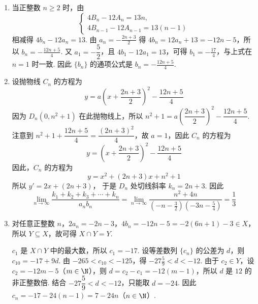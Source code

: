 \begin{solution}
\begin{enumerate}
\item 当正整数 \(n\geqslant2\) 时，由
\[
\begin{cases}
4B_n-12A_n=13n,\\
4B_{n-1}-12A_{n-1}=13(n-1)
\end{cases}
\]
相减得 \(4b_n-12a_n=13\). 由 \(a_n=-\frac{2n+3}{2}\) 得
\(4b_n=12a_n+13=-12n-5\)，所以 \(b_n=-\frac{12n+5}{4}\).
又 \(a_1=-\dfrac52\)，且 \(4b_1-12a_1=13\)，可得 \(b_1=-\frac{17}{4}\)，与上式在 \(n=1\) 时一致. 因此 \(\{b_n\}\) 的通项公式是 \(b_n=-\frac{12n+5}{4}\).

\item 设抛物线 \(C_n\) 的方程为
\[
y=a\left(x+\frac{2n+3}{2}\right)^2-\frac{12n+5}{4}
\]
因为 \(D_n(0,n^{2}+1)\) 在此抛物线上，所以
\(n^2+1=a\left(\dfrac{2n+3}{2}\right)^2-\dfrac{12n+5}{4}\). 注意到 \(n^2+1+\dfrac{12n+5}{4}=\dfrac{(2n+3)^2}{4}\)，故 \(a=1\)，因此 \(C_n\) 的方程为
\[
y=\left(x+\frac{2n+3}{2}\right)^2-\frac{12n+5}{4}
\]
因此，\(C_n\) 的方程为
\[
y=x^2+(2n+3)x+n^2+1
\]
所以 \(y'=2x+(2n+3)\)，
于是 \(D_n\) 处切线斜率 \(k_n=2n+3\).
因此
\[
\lim_{n\to\infty}\frac{k_1+k_2+k_3+\cdots+k_n}{a_nb_n}
=\lim_{n\to\infty}\frac{n^2+4n}{\left(-n-\frac{3}{2}\right)\left(-3n-\frac{5}{4}\right)}
=\frac{1}{3}
\]

\item 对任意正整数 \(n\)，\(2a_n=-2n-3\)，\(4b_n=-12n-5=-2(6n+1)-3\in X\)，所以 \(Y\subseteq X\)，故可得 \(X\cap Y=Y\).

\(c_1\) 是 \(X\cap Y\) 中的最大数，所以 \(c_1=-17\). 设等差数列 \(\{c_n\}\) 的公差为 \(d\)，则 \(c_{10}=-17+9d\).
由 \(-265<c_{10}<-125\)，得 \(-27\frac{5}{9}<d<-12\).
由于 \(c_2\in Y\)，设 \(c_2=-12m-5\)（\(m\in\N\)），则 \(d=c_2-c_1=-12(m-1)\)，所以 \(d\) 是 \(12\) 的非正整数倍. 结合 \(-27\dfrac59<d<-12\)，只能取 \(d=-24\). 因此 \(c_n=-17-24(n-1)=7-24n\)（\(n\in\N\)）.
\end{enumerate}
\end{solution}
